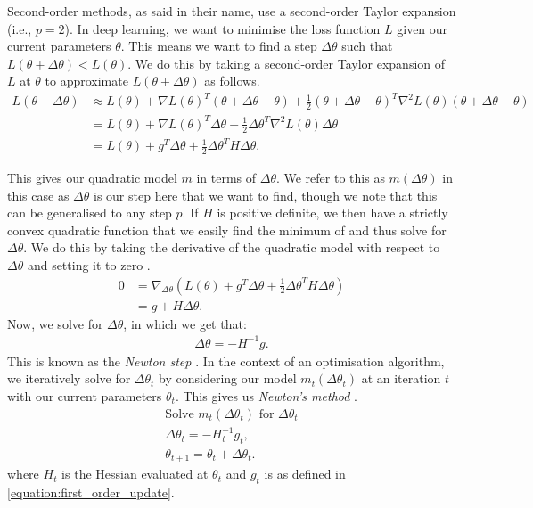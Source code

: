 Second-order methods, as said in their name, use a second-order Taylor expansion (i.e., $p = 2$). In deep learning, we want to minimise the loss function $L$ given our current parameters $\theta$. This means we want to find a step $\Delta \theta$ such that $L(\theta + \Delta \theta) < L(\theta)$. We do this by taking a second-order Taylor expansion of $L$ at $\theta$ to approximate $L(\theta + \Delta \theta)$ as follows.
\begin{align}
    L(\theta + \Delta \theta) &\approx L(\theta) + \nabla L(\theta)^T (\theta + \Delta \theta - \theta) + \frac{1}{2} (\theta + \Delta \theta - \theta)^T \nabla^2 L(\theta) (\theta + \Delta \theta - \theta) \\
    &= L(\theta) + \nabla L(\theta)^T \Delta \theta + \frac{1}{2} \Delta \theta^T \nabla^2 L(\theta) \Delta \theta \\
    &= L(\theta) + g^T \Delta \theta + \frac{1}{2} \Delta \theta^T H \Delta \theta.
    \label{equation:quadratic_model_w_loss}
\end{align}

This gives our quadratic model $m$ in terms of $\Delta \theta$. We refer to this as $m(\Delta \theta)$ in this case as $\Delta \theta$ is our step here that we want to find, though we note that this can be generalised to any step $p$. If $H$ is positive definite, we then have a strictly convex quadratic function that we easily find the minimum of and thus solve for $\Delta \theta$. We do this by taking the derivative of the quadratic model with respect to $\Delta \theta$ and setting it to zero \citep{NoceWrig06}.
\begin{align}
    0 &= \nabla_{\Delta \theta} \left( L(\theta) + g^T \Delta \theta + \frac{1}{2} \Delta \theta^T H \Delta \theta \right) \\
    &= g + H \Delta \theta.
\end{align}
Now, we solve for $\Delta \theta$, in which we get that:
\begin{align}
    \Delta \theta = - H^{-1} g.
\end{align} 
This is known as the \textit{Newton step} \citep{NoceWrig06, cvbook, mml_book}. In the context of an optimisation algorithm, we iteratively solve for $\Delta \theta_t$ by considering our model $m_t(\Delta \theta_t)$ at an iteration $t$ with our current parameters $\theta_t$. This gives us \textit{Newton's method} \citep{NoceWrig06,cvbook,mml_book}.
\begin{align}
    \text{Solve } m_t(\Delta \theta_t) \text{ for } \Delta \theta_t \\
    \Delta \theta_t = -H_t^{-1} g_t, \\
    \theta_{t+1} = \theta_t + \Delta \theta_t.
\end{align}
where $H_t$ is the Hessian evaluated at $\theta_t$ and $g_t$ is as defined in \cref{equation:first_order_update}.

